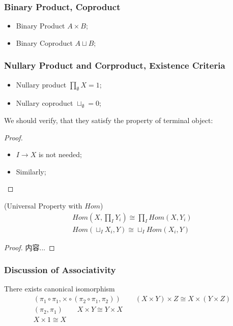 \documentclass[Total.tex]{subfiles}
\begin{document}
				\subsubsection{Binary Product, Coproduct}
					\begin{Def}
						\begin{itemize}
							\item Binary Product $A\times B$;
							\item Binary Coproduct $A\sqcup B$;
						\end{itemize}
					\end{Def}
				\subsubsection{Nullary Product and Corproduct, Existence Criteria}
					\begin{Def}
						\begin{itemize}
							\item Nullary product $\prod_\emptyset X=1$;
							\item Nullary coproduct $\sqcup_\emptyset=0$;
						\end{itemize}
					\end{Def}
					
					We should verify, that they satisfy the property of terminal object:
					\begin{proof}
						\begin{itemize}
							\item $I\rightarrow X$ is not needed;
							\item Similarly;
						\end{itemize}
					\end{proof}
					
					\begin{proposition}
						(Universal Property with $Hom$) 
						\begin{gather*}
							Hom(X,\prod_I Y_i)\cong \prod_I Hom(X,Y_i)\\
							Hom(\sqcup_I X_i,Y)\cong \sqcup_I Hom(X_i,Y)
						\end{gather*}
					\end{proposition}
					\begin{proof}
						内容...
					\end{proof}
					
				\subsubsection{Discussion of Associativity}
					There exists canonical isomorphism
					\begin{gather*}
						(\pi_1\circ\pi_1,\times\circ (\pi_2\circ \pi_1,\pi_2))\qquad (X\times Y)\times Z\cong X\times (Y\times Z)\\
						(\pi_2,\pi_1)\qquad X\times Y\cong Y\times X\\
						X\times 1\cong X
					\end{gather*}
					
\end{document}
